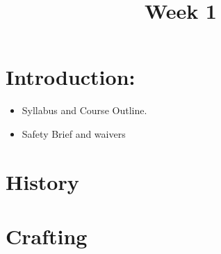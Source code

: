 \documentclass[11pt]{article}
\title{Week 1}
\date{}
\begin{document}
    \maketitle


    \section*{Introduction:}
        \begin{itemize}
            \item Syllabus and Course Outline.
            \item Safety Brief and waivers
        \end{itemize}


    \section*{History}
        \begin{itemize}
        \end{itemize}

    \section*{Crafting}
        \begin{itemize}
        \end{itemize}
\end{document}
